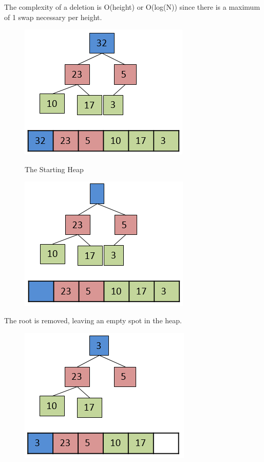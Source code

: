 The complexity of a deletion is O(height) or O(log(N)) since there is a maximum of 1 swap necessary per height.

\begin{figure}[H]
\centering
\includegraphics{pictures/heap11.png}
\label{fig:heap11}
\caption{The Starting Heap}
\end{figure}

\begin{figure}[H]
\centering
\includegraphics{pictures/heap12.png}
\label{fig:heap12}
\end{figure}

The root is removed, leaving an empty spot in the heap.

\begin{figure}[H]
\centering
\includegraphics{pictures/heap13.png}
\label{fig:heap13}
\end{figure}

